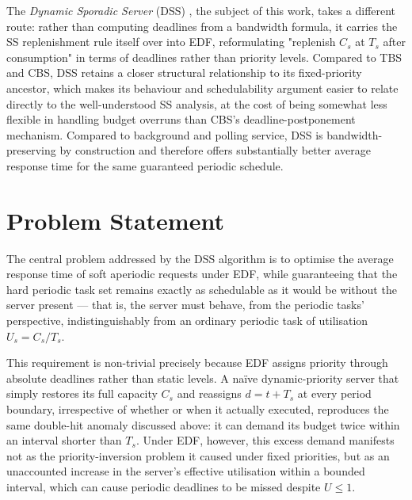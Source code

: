 \documentclass[conference]{IEEEtran}
\begin{document}
    The \emph{Dynamic Sporadic Server} (DSS) \cite{Spuri1996}, the subject of this work, takes a different route: rather than computing deadlines from a bandwidth formula, it carries the SS replenishment rule itself over into EDF, reformulating "replenish $C_s$ at $T_s$ after consumption" in terms of deadlines rather than priority levels. Compared to TBS and CBS, DSS retains a closer structural relationship to its fixed-priority ancestor, which makes its behaviour and schedulability argument easier to relate directly to the well-understood SS analysis, at the cost of being somewhat less flexible in handling budget overruns than CBS's deadline-postponement mechanism. Compared to background and polling service, DSS is bandwidth-preserving by construction and therefore offers substantially better average response time for the same guaranteed periodic schedule.


    \section{Problem Statement}
    \label{sec:problem-statement}

    The central problem addressed by the DSS algorithm is to optimise the average response time of soft aperiodic requests under EDF, while guaranteeing that the hard periodic task set remains exactly as schedulable as it would be without the server present — that is, the server must behave, from the periodic tasks' perspective, indistinguishably from an ordinary periodic task of utilisation $U_s = C_s / T_s$.

    This requirement is non-trivial precisely because EDF assigns priority through absolute deadlines rather than static levels. A naïve dynamic-priority server that simply restores its full capacity $C_s$ and reassigns $d = t + T_s$ at every period boundary, irrespective of whether or when it actually executed, reproduces the same double-hit anomaly discussed above: it can demand its budget twice within an interval shorter than $T_s$. Under EDF, however, this excess demand manifests not as the priority-inversion problem it caused under fixed priorities, but as an unaccounted increase in the server's effective utilisation within a bounded interval, which can cause periodic deadlines to be missed despite $U \leq 1$.
\end{document}

